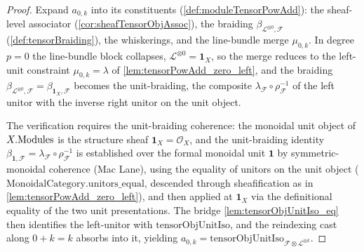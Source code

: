 \begin{proof}
    \leanok
  Expand \(a_{0,k}\) into its constituents (\cref{def:moduleTensorPowAdd}): the
  sheaf-level associator (\cref{cor:sheafTensorObjAssoc}), the braiding
  \(\beta_{\mathcal{L}^{\otimes 0},\mathcal{F}}\) (\cref{def:tensorBraiding}), the
  whiskerings, and the line-bundle merge \(\mu_{0,k}\). In degree \(p=0\) the
  line-bundle block collapses, \(\mathcal{L}^{\otimes 0}=\mathbf{1}_X\), so the merge
  reduces to the left-unit constraint \(\mu_{0,k}=\lambda\) of
  \cref{lem:tensorPowAdd_zero_left}, and the braiding
  \(\beta_{\mathcal{L}^{\otimes 0},\mathcal{F}}=\beta_{\mathbf{1}_X,\mathcal{F}}\)
  becomes the unit-braiding, the composite \(\lambda_{\mathcal{F}} \circ
  \rho_{\mathcal{F}}^{-1}\) of the left unitor with the inverse right unitor on the
  unit object.

  The verification requires the unit-braiding coherence: the monoidal unit object of
  \(X.\mathrm{Modules}\) is the structure sheaf \(\mathbf{1}_X = \mathcal{O}_X\), and the
  unit-braiding identity \(\beta_{\mathbf{1},\mathcal{F}} = \lambda_{\mathcal{F}} \circ
  \rho_{\mathcal{F}}^{-1}\) is established over the formal monoidal unit \(\mathbf{1}\)
  by symmetric-monoidal coherence (Mac Lane), using the equality of unitors on the
  unit object (\(\mathrm{MonoidalCategory.unitors\_equal}\), descended through
  sheafification as in \cref{lem:tensorPowAdd_zero_left}), and then applied at
  \(\mathbf{1}_X\) via the definitional equality of the two unit presentations.
  The bridge \cref{lem:tensorObjUnitIso_eq} then identifies the left-unitor with
  \(\mathrm{tensorObjUnitIso}\), and the reindexing cast along \(0+k=k\) absorbs
  into it, yielding
  \(a_{0,k}=\mathrm{tensorObjUnitIso}_{\mathcal{F}\otimes\mathcal{L}^{\otimes k}}\).
\end{proof}

